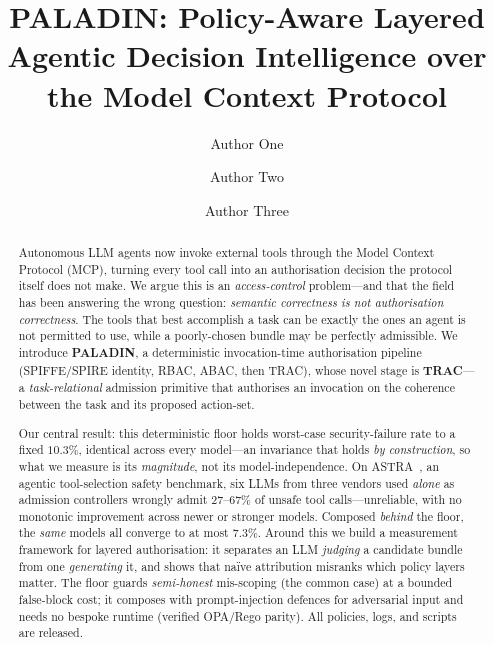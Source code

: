 \documentclass[sigconf,review,anonymous]{acmart}
\title{PALADIN: Policy-Aware Layered Agentic Decision Intelligence over the Model Context Protocol}
\author{Author One}
\affiliation{%
  \institution{Anonymous Institution}
  \city{Anonymous City}
  \country{Anonymous Country}
}
\author{Author Two}
\affiliation{%
  \institution{Anonymous Institution}
  \city{Anonymous City}
  \country{Anonymous Country}
}
\author{Author Three}
\affiliation{%
  \institution{Anonymous Institution}
  \city{Anonymous City}
  \country{Anonymous Country}
}
\begin{document}
\begin{abstract}
\begin{sloppypar}
Autonomous LLM agents now invoke external tools through the Model Context Protocol (MCP), turning every tool call into an authorisation decision the protocol itself does not make. We argue this is an \emph{access-control} problem---and that the field has been answering the wrong question: \emph{semantic correctness is not authorisation correctness}. The tools that best accomplish a task can be exactly the ones an agent is not permitted to use, while a poorly-chosen bundle may be perfectly admissible. We introduce \textbf{PALADIN}, a deterministic invocation-time authorisation pipeline (SPIFFE/SPIRE identity, RBAC, ABAC, then TRAC), whose novel stage is \textbf{TRAC}---a \emph{task-relational} admission primitive that authorises an invocation on the coherence between the task and its proposed action-set.

Our central result: this deterministic floor holds worst-case security-failure rate to a fixed $10.3\%$, identical across every model---an invariance that holds \emph{by construction}, so what we measure is its \emph{magnitude}, not its model-independence. On ASTRA~\cite{elhelou2025astra}, an agentic tool-selection safety benchmark, six LLMs from three vendors used \emph{alone} as admission controllers wrongly admit $27$--$67\%$ of unsafe tool calls---unreliable, with no monotonic improvement across newer or stronger models. Composed \emph{behind} the floor, the \emph{same} models all converge to at most $7.3\%$. Around this we build a measurement framework for layered authorisation: it separates an LLM \emph{judging} a candidate bundle from one \emph{generating} it, and shows that na\"ive attribution misranks which policy layers matter. The floor guards \emph{semi-honest} mis-scoping (the common case) at a bounded false-block cost; it composes with prompt-injection defences for adversarial input and needs no bespoke runtime (verified OPA/Rego parity). All policies, logs, and scripts are released.
\end{sloppypar}
\end{abstract}

\maketitle
\end{document}
